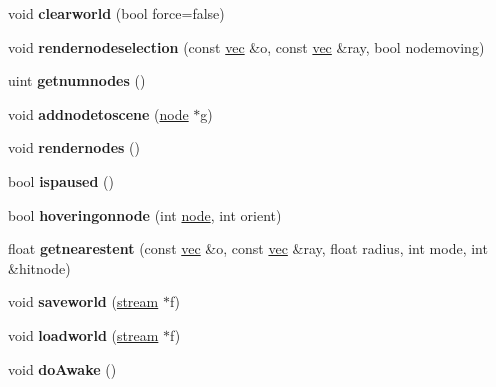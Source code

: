 \begin{DoxyCompactItemize}
\mbox{\label{structworld_a9f3b7025c48694f57e756a3c8293a396}} 
void {\bfseries clearworld} (bool force=false)
\item 
\mbox{\label{structworld_a37ed87933ab6e6ee3bf3325c70caabb8}} 
void {\bfseries rendernodeselection} (const \hyperlink{structvec}{vec} \&o, const \hyperlink{structvec}{vec} \&ray, bool nodemoving)
\item 
\mbox{\label{structworld_a6472face5c089ac24894badeeb75e360}} 
uint {\bfseries getnumnodes} ()
\item 
\mbox{\label{structworld_a534f195f9371b4be2b10f1d673b14044}} 
void {\bfseries addnodetoscene} (\hyperlink{structnode}{node} $\ast$g)
\item 
\mbox{\label{structworld_a06b4b9b97ec3a583d329838ed51f32a4}} 
void {\bfseries rendernodes} ()
\item 
\mbox{\label{structworld_a248d05ed2c1406b2877f67c0b35b92bb}} 
bool {\bfseries ispaused} ()
\item 
\mbox{\label{structworld_aada8b74280e0132d203c3121699d9eba}} 
bool {\bfseries hoveringonnode} (int \hyperlink{structnode}{node}, int orient)
\item 
\mbox{\label{structworld_a9f0325c0963d3093ec9c456e2d4aba42}} 
float {\bfseries getnearestent} (const \hyperlink{structvec}{vec} \&o, const \hyperlink{structvec}{vec} \&ray, float radius, int mode, int \&hitnode)
\item 
\mbox{\label{structworld_aa533c4c2441c97f38967fde3ec088e33}} 
void {\bfseries saveworld} (\hyperlink{structstream}{stream} $\ast$f)
\item 
\mbox{\label{structworld_a6405a56deb7e1122e3092a752830e2b0}} 
void {\bfseries loadworld} (\hyperlink{structstream}{stream} $\ast$f)
\item 
\mbox{\label{structworld_af5e70ab43ba8fd3b6836a9910427b397}} 
void {\bfseries do\+Awake} ()
\item 
\mbox{\label{structworld_ae69154444456dbd42d475c4dc46a6d9e}} 

\end{DoxyCompactItemize}
